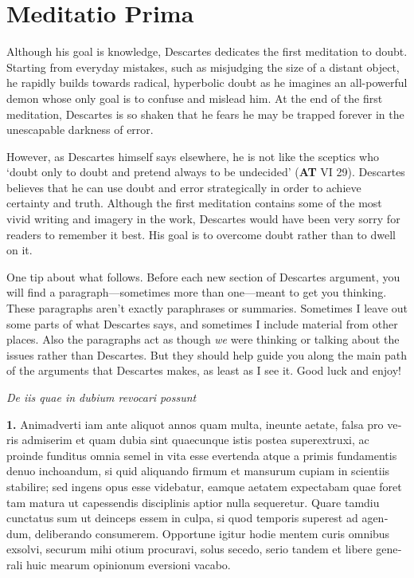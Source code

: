 \chapter{Meditatio Prima}


Although his goal is knowledge, Descartes dedicates the first meditation to doubt. Starting from everyday mistakes, such as misjudging the size of a distant object, he rapidly builds towards radical, hyperbolic doubt as he imagines an all-powerful demon whose only goal is to confuse and mislead him. At the end of the first meditation, Descartes is so shaken that he fears he may be trapped forever in the unescapable darkness of error.

However, as Descartes himself says elsewhere, he is not like the sceptics who `doubt only to doubt and pretend always to be undecided' (\textbf{AT} VI 29). Descartes believes that he can use doubt and error strategically in order to achieve certainty and truth. Although the first meditation contains some of the most vivid writing and imagery in the work, Descartes would have been very sorry for readers to remember it best. His goal is to overcome doubt rather than to dwell on it.

One tip about what follows. Before each new section of Descartes argument, you will find a paragraph---sometimes more than one---meant to get you thinking. These paragraphs aren't exactly paraphrases or summaries. Sometimes I leave out some parts of what Descartes says, and sometimes I include material from other places. Also the paragraphs act as though \textit{we} were thinking or talking about the issues rather than Descartes. But they should help guide you along the main path of the arguments that Descartes makes, as least as I see it. Good luck and enjoy!

\clearpage
\begin{center}
    \beginnumbering
    \numberlinefalse
    \pstart
    \textit{De iis quae in dubium revocari possunt}
    \pend
    \endnumbering
\end{center}

\beginnumbering
\pstart
\begin{latin}
    \textenglish{\textbf{1.}} Animadverti iam ante aliquot annos quam multa, ineunte aetate, falsa pro veris admiserim et quam dubia sint quaecunque istis postea superextruxi, ac proinde funditus omnia semel in vita esse evertenda atque a primis fundamentis denuo inchoandum, si quid aliquando firmum et mansurum cupiam in scientiis stabilire; sed ingens opus esse videbatur, eamque aetatem expectabam quae foret tam matura ut capessendis disciplinis aptior nulla sequeretur. Quare tamdiu cunctatus sum ut deinceps essem in culpa, si quod temporis superest ad agendum, deliberando consumerem. Opportune igitur hodie mentem curis omnibus exsolvi, securum mihi otium procuravi, solus secedo, serio tandem et libere generali huic mearum opinionum eversioni vacabo.
\end{latin}
\pend
\endnumbering

